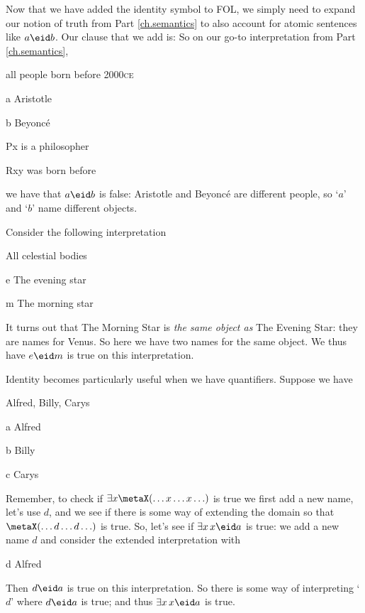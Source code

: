Now that we have added the identity symbol to FOL, we simply need to expand our notion of truth from Part \ref{ch.semantics} to also account for atomic sentences like $a\eid b$. Our clause that we add is:
So on our go-to interpretation from Part \ref{ch.semantics},
\begin{ekey}
		\item[\text{domain}] all people born before 2000\textsc{ce}
		\item[a] Aristotle
		\item[b] Beyonc\'e
		\item[Px]  is a philosopher
		\item[Rxy]  was born before 
	\end{ekey} we have that $a\eid b$ is false: Aristotle and Beyonc\'e are different people, so `$a$' and `$b$' name different objects.

Consider the following interpretation
\begin{ekey}
\item[\text{domain}] All celestial bodies
\item[e] The evening star
\item[m] The morning star
\end{ekey} It turns out that The Morning Star is \emph{the same object as} The Evening Star: they are names for Venus. So here we have two names for the same object. We thus have $e\eid m$ is true on this interpretation.

Identity becomes particularly useful when we have quantifiers. Suppose we have
\begin{ekey}
\item[\text{domain}] Alfred, Billy, Carys
\item[a] Alfred
\item[b] Billy
\item[c] Carys
\end{ekey}
Remember, to check if $\exists x\metaX(\ldots x\ldots x\ldots)$ is true we first add a new name, let's use $d$, and we see if there is some way of extending the domain so that $\metaX(\ldots d\ldots d\ldots)$ is true. So, let's see if $\exists x \,x\eid a$ is true: we add a new name $d$ and consider the extended interpretation with
\begin{ekey}
\item[d] Alfred
\end{ekey}
Then $d\eid a$ is true on this interpretation. So there is some way of interpreting `$d$' where $d\eid a$ is true; and thus $\exists x \, x\eid a$ is true.

